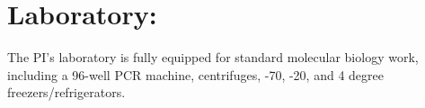 \section*{Laboratory:} The PI’s laboratory is fully equipped for standard molecular biology work, including a 96-well PCR machine, centrifuges, -70, -20, and 4 degree freezers/refrigerators.